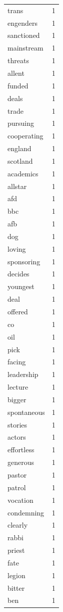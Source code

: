 \begin{tabular}{lr}
trans & 1 \\
engenders & 1 \\
sanctioned & 1 \\
mainstream & 1 \\
threats & 1 \\
allent & 1 \\
funded & 1 \\
deals & 1 \\
trade & 1 \\
pursuing & 1 \\
cooperating & 1 \\
england & 1 \\
scotland & 1 \\
academics & 1 \\
allstar & 1 \\
afd & 1 \\
bbc & 1 \\
afb & 1 \\
dog & 1 \\
loving & 1 \\
sponsoring & 1 \\
decides & 1 \\
youngest & 1 \\
deal & 1 \\
offered & 1 \\
co & 1 \\
oil & 1 \\
pick & 1 \\
facing & 1 \\
leadership & 1 \\
lecture & 1 \\
bigger & 1 \\
spontaneous & 1 \\
stories & 1 \\
actors & 1 \\
effortless & 1 \\
generous & 1 \\
pastor & 1 \\
patrol & 1 \\
vocation & 1 \\
condemning & 1 \\
clearly & 1 \\
rabbi & 1 \\
priest & 1 \\
fate & 1 \\
legion & 1 \\
bitter & 1 \\
ben & 1 \\

\end{tabular}
